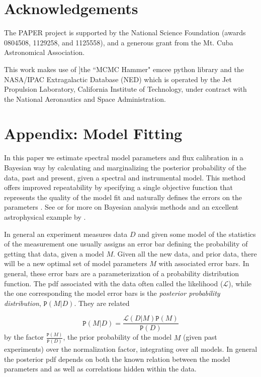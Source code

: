 \documentclass[preprint]{aastex}
\newcommand{\Prob}{\mathtt{P}}
\begin{document}
\section*{Acknowledgements}
The PAPER project is supported by the National Science Foundation (awards 0804508, 1129258, and 1125558), and a generous grant from the Mt. Cuba Astronomical Association.

This work makes use of ]the ``MCMC Hammer"
	emcee python library \citep[  \url{http://danfm.ca/emcee/}]{ForemanMackey:2012p8684}  and the NASA/IPAC Extragalactic Database (NED) which is operated by the Jet Propulsion Laboratory, California Institute of Technology, under contract with the National Aeronautics and Space Administration.

\section*{Appendix: Model Fitting}
In this paper we estimate spectral model parameters and flux calibration in a Bayesian way by calculating and marginalizing the posterior probability of the data, past and present, given a spectral and instrumental model.   This method offers improved repeatability by specifying a single objective function that represents the quality of the model fit and naturally defines the errors on the parameters \citep{Hogg:2010p8759}.   See  \citet{Mackay:2003p9717}  or \citet{Sivia:2006p9736} for more on Bayesian analysis methods and an excellent astrophysical example by \cite{Press:1997p9783}.

In general an experiment measures data $D$ and given some model of the statistics of the measurement one usually assigns an error bar defining the probability of getting that data, given a model $M$.  Given all the new data, and prior data, there will be a new optimal set of model parameters $M$ with associated error bars.  In general, these error bars are a parameterization of a probability distribution function.  The pdf associated with the data often called the likelihood ($\mathcal{L}$), while the one corresponding the model error bars is the {\em posterior probability distribution}, $\Prob(M|D)$. They are related


\[
\Prob(M|D) = \frac{\mathcal{L}(D|M) \Prob(M)}{\Prob(D)}
\] 
by the factor $\frac{\Prob(M)}{\Prob(D)}$, the prior probability of the model $M$ (given past experiments) over the normalization factor, integrating over all models.  In general the posterior pdf depends on both the known relation between the model parameters and as well as correlations hidden within the data.  
\end{document}
